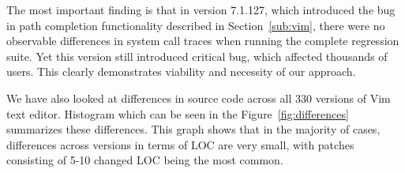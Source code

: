 
The most important finding is that in version 7.1.127, which introduced the
bug in path completion functionality described in Section~\ref{sub:vim}, there
were no observable differences in system call traces when running the complete
regression suite. Yet this version still introduced critical bug, which
affected thousands of users. This clearly demonstrates viability and necessity
of our approach.

We have also looked at differences in source code across all 330 versions of
Vim text editor. Histogram which can be seen in the
Figure~\ref{fig:differences} summarizes these differences.  This graph shows
that in the majority of cases, differences across versions in terms of LOC are
very small, with patches consisting of 5-10 changed LOC being the most common.


